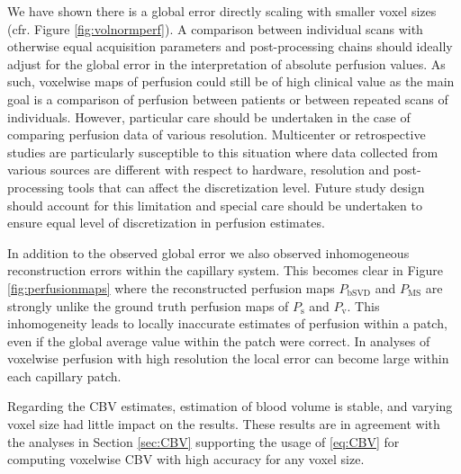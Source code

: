 \documentclass[final,5p,times,twocolumn]{elsarticle}
\begin{document}
We have shown there is a global error directly scaling with smaller voxel sizes (cfr. Figure \ref{fig:volnormperf}). A comparison between individual scans with otherwise equal acquisition parameters and post-processing chains should ideally adjust for the global error in the interpretation of absolute perfusion values. As such, voxelwise maps of perfusion could still be of high clinical value as the main goal is a comparison of perfusion between patients or between repeated scans of individuals. However, particular care should be undertaken in the case of comparing perfusion data of various resolution. Multicenter or retrospective studies are particularly susceptible to this situation where data collected from various sources are different with respect to hardware, resolution and post-processing tools that can affect the discretization level. Future study design should account for this limitation and special care should be undertaken to ensure equal level of discretization in perfusion estimates. 

In addition to the observed global error we also observed inhomogeneous reconstruction errors within the capillary system. This becomes clear in Figure \ref{fig:perfusionmaps} where the reconstructed perfusion maps $P_{\mathrm{bSVD}}$ and $P_{\mathrm{MS}}$ are strongly unlike the ground truth perfusion maps of $P_{\mathrm{s}}$ and $P_{\mathrm{v}}$. This inhomogeneity leads to locally inaccurate estimates of perfusion within a patch, even if the global average value within the patch were correct. 
In analyses of voxelwise perfusion with high resolution the local error can become large within each capillary patch.
 
	Regarding the CBV estimates, estimation of blood volume is stable, and varying voxel size had little impact on the results. These results are in agreement with the analyses in Section \ref{sec:CBV} supporting the usage of \eqref{eq:CBV} for computing voxelwise CBV with high accuracy for any voxel size.
	
\end{document}
